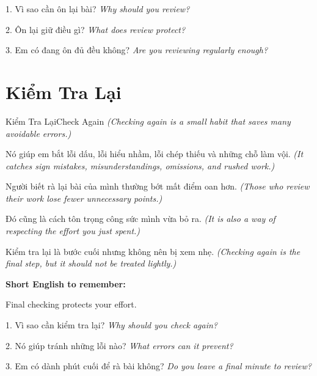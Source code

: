 \begin{tuhocnhanh}
1. Vì sao cần ôn lại bài? \textit{Why should you review?}

2. Ôn lại giữ điều gì? \textit{What does review protect?}

3. Em có đang ôn đủ đều không? \textit{Are you reviewing regularly enough?}
\end{tuhocnhanh}
\ngancach

\section{Kiểm Tra Lại}
\begin{truyen}{Kiểm Tra Lại}{Check Again}
\textit{(Checking again is a small habit that saves many avoidable errors.)}

Nó giúp em bắt lỗi dấu, lỗi hiểu nhầm, lỗi chép thiếu và những chỗ làm vội.
\textit{(It catches sign mistakes, misunderstandings, omissions, and rushed work.)}

Người biết rà lại bài của mình thường bớt mất điểm oan hơn.
\textit{(Those who review their work lose fewer unnecessary points.)}

Đó cũng là cách tôn trọng công sức mình vừa bỏ ra.
\textit{(It is also a way of respecting the effort you just spent.)}
\end{truyen}

\begin{baihoc}
Kiểm tra lại là bước cuối nhưng không nên bị xem nhẹ.
\textit{(Checking again is the final step, but it should not be treated lightly.)}
\end{baihoc}

\begin{ghinhoanh}
\textbf{Short English to remember:}

Final checking protects your effort.

\end{ghinhoanh}

\begin{tuhocnhanh}
1. Vì sao cần kiểm tra lại? \textit{Why should you check again?}

2. Nó giúp tránh những lỗi nào? \textit{What errors can it prevent?}

3. Em có dành phút cuối để rà bài không? \textit{Do you leave a final minute to review?}
\end{tuhocnhanh}
\ngancach

